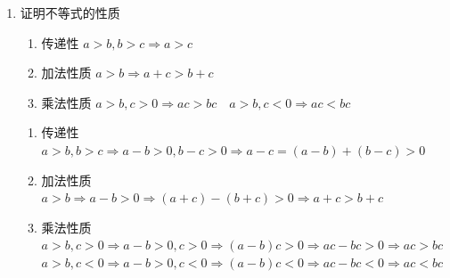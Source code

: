 \begin{enumerate}
    \item 证明不等式的性质
    \begin{enumerate}
        \item 传递性 $a > b, b > c \Longrightarrow a > c$
        \item 加法性质 $a > b \Longrightarrow a + c > b + c$
        \item 乘法性质 $a > b, c > 0 \Longrightarrow ac > bc \quad a > b, c < 0 \Longrightarrow ac < bc$
    \end{enumerate}
    \begin{jieda}
        \begin{enumerate}
            \item 传递性 \\
                    $a > b, b > c \Longrightarrow a - b > 0, b - c > 0 \Longrightarrow a - c = (a - b) + (b - c) > 0$
            \item 加法性质 \\
                    $a > b \Longrightarrow a - b > 0 \Longrightarrow (a+c) - (b+c) > 0 \Longrightarrow a + c > b + c$
            \item 乘法性质 \\
                    $a > b, c > 0 \Longrightarrow a - b > 0, c > 0 \Longrightarrow (a - b)c > 0 \Longrightarrow ac - bc > 0 \Longrightarrow ac > bc$ \\
                    $a > b, c < 0 \Longrightarrow a - b > 0, c < 0 \Longrightarrow (a - b)c < 0 \Longrightarrow ac - bc < 0 \Longrightarrow ac < bc$
        \end{enumerate}
    \end{jieda}


\end{enumerate}
